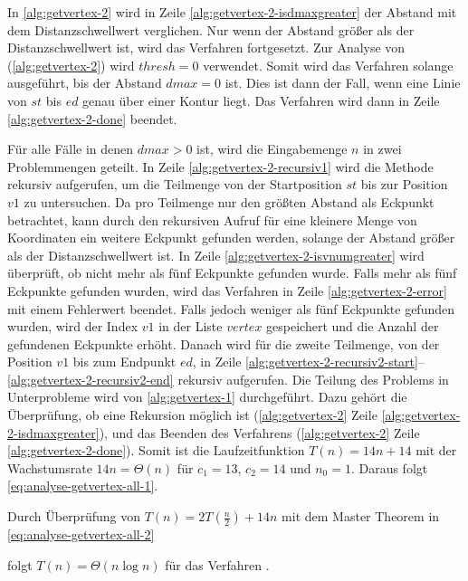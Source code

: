In \autoref{alg:getvertex-2} wird in Zeile \ref{alg:getvertex-2-isdmaxgreater} der Abstand mit dem Distanzschwellwert
 verglichen. Nur wenn der Abstand größer als der Distanzschwellwert ist, wird das Verfahren fortgesetzt. Zur Analyse
 von  (\autoref{alg:getvertex-2}) wird $\mathit{thresh} = 0$ verwendet. Somit wird das
 Verfahren solange ausgeführt, bis der Abstand $\mathit{dmax} = 0$ ist. Dies ist dann der Fall, wenn eine Linie von
 $\mathit{st}$ bis $\mathit{ed}$ genau über einer Kontur liegt. Das Verfahren wird dann in Zeile
 \ref{alg:getvertex-2-done} beendet.

Für alle Fälle in denen $\mathit{dmax} > 0$ ist, wird die Eingabemenge $n$ in zwei Problemmengen geteilt. In Zeile
 \ref{alg:getvertex-2-recursiv1} wird die Methode  rekursiv aufgerufen, um die Teilmenge von der
 Startposition $\mathit{st}$ bis zur Position $\mathit{v1}$ zu untersuchen. Da  pro Teilmenge nur
 den größten Abstand als Eckpunkt betrachtet, kann durch den rekursiven Aufruf für eine kleinere Menge von Koordinaten
 ein weitere Eckpunkt gefunden werden, solange der Abstand größer als der Distanzschwellwert ist. In Zeile
 \ref{alg:getvertex-2-isvnumgreater} wird überprüft, ob nicht mehr als fünf Eckpunkte gefunden wurde. Falls mehr als
 fünf Eckpunkte gefunden wurden, wird das Verfahren in Zeile \ref{alg:getvertex-2-error} mit einem Fehlerwert beendet.
 Falls jedoch weniger als fünf Eckpunkte gefunden wurden, wird der Index $\mathit{v1}$ in der Liste $\mathit{vertex}$
 gespeichert und die Anzahl der gefundenen Eckpunkte erhöht. Danach wird  für die zweite Teilmenge,
 von der Position $\mathit{v1}$ bis zum Endpunkt $\mathit{ed}$, in Zeile
  \ref{alg:getvertex-2-recursiv2-start}--\ref{alg:getvertex-2-recursiv2-end} rekursiv aufgerufen. Die Teilung des
 Problems in Unterprobleme wird von \autoref{alg:getvertex-1} durchgeführt. Dazu gehört die Überprüfung, ob eine
 Rekursion möglich ist (\autoref{alg:getvertex-2} Zeile \ref{alg:getvertex-2-isdmaxgreater}), und das Beenden des
 Verfahrens (\autoref{alg:getvertex-2} Zeile \ref{alg:getvertex-2-done}). Somit ist die Laufzeitfunktion
 $T(n) = 14n + 14$ mit der Wachstumsrate $14n = \Theta(n)$ für $c_{1} = 13$, $c_{2} = 14$ und $n_{0} = 1$. Daraus
 folgt \autoref{eq:analyse-getvertex-all-1}.

Durch Überprüfung von $T(n) = 2T(\tfrac{n}{2}) + 14n$ mit dem Master Theorem in \autoref{eq:analyse-getvertex-all-2}

folgt $T(n) = \Theta(n \log n)$ für das Verfahren .

